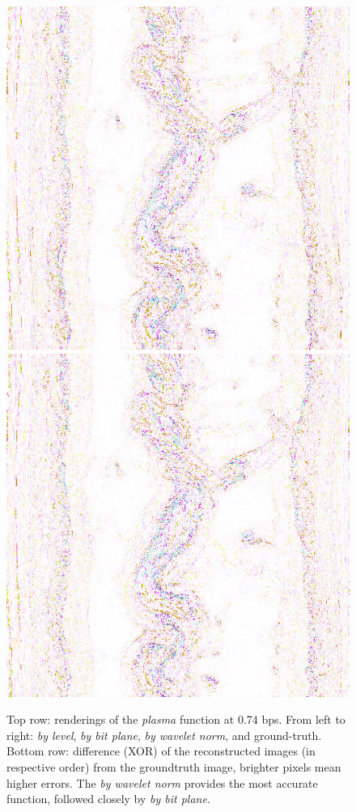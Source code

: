 \begin{figure}[h]
	{\includegraphics[width=0.24\linewidth]{img/rmse/plasma_curr_func0_diff.png}}
	{\includegraphics[width=0.24\linewidth]{img/rmse/signature_curr_func0_diff.png}}
	
	\caption{Top row:	renderings of the \emph{plasma} function at 0.74 bps. From left to right:
	\emph{by level}, \emph{by bit plane}, \emph{by wavelet norm}, and ground-truth. Bottom row:
	difference (XOR) of the reconstructed images (in respective order) from the groundtruth image,
	brighter pixels mean higher errors. The \emph{by wavelet norm} provides the most accurate
	function, followed closely by
	\emph{by bit plane}.}
 	\label{fig:rmse-rendering}
\end{figure}

